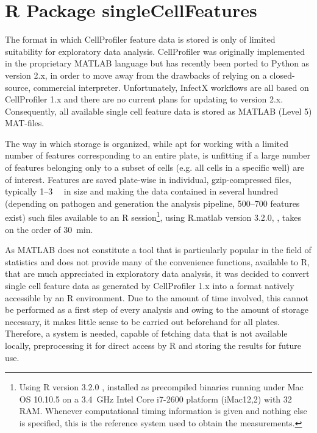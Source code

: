 \chapter{R Package singleCellFeatures}
\label{ch:singlecellfeatures}

The format in which CellProfiler feature data is stored is only of limited suitability for exploratory data analysis. CellProfiler was originally implemented in the proprietary MATLAB language but has recently been ported to Python as version 2.x, in order to move away from the drawbacks of relying on a closed-source, commercial interpreter. Unfortunately, InfectX workflows are all based on CellProfiler 1.x and there are no current plans for updating to version 2.x. Consequently, all available single cell feature data is stored as MATLAB (Level 5) MAT-files.

The way in which storage is organized, while apt for working with a limited number of features corresponding to an entire plate, is unfitting if a large number of features belonging only to a subset of cells (e.g. all cells in a specific well) are of interest. Features are saved plate-wise in individual, gzip-compressed files, typically 1--\SI{3}{\mega\byte} in size and making the data contained in several hundred (depending on pathogen and generation the analysis pipeline, 500--700 features exist) such files available to an R session\footnote{Using R version 3.2.0 \citep{RCoreTeam2015}, installed as precompiled binaries running under Mac OS 10.10.5 on a \SI{3.4}{\giga\hertz} Intel Core i7-2600 platform (iMac12,2) with \SI{32}{\giga\byte} RAM. Whenever computational timing information is given and nothing else is specified, this is the reference system used to obtain the measurements.}, using R.matlab version 3.2.0, \cite{Bengtsson2015}, takes on the order of \SI{30}{\minute}.

As MATLAB does not constitute a tool that is particularly popular in the field of statistics and does not provide many of the convenience functions, available to R, that are much appreciated in exploratory data analysis, it was decided to convert single cell feature data as generated by CellProfiler 1.x into a format natively accessible by an R environment. Due to the amount of time involved, this cannot be performed as a first step of every analysis and owing to the amount of storage necessary, it makes little sense to be carried out beforehand for all plates. Therefore, a system is needed, capable of fetching data that is not available locally, preprocessing it for direct access by R and storing the results for future use.

